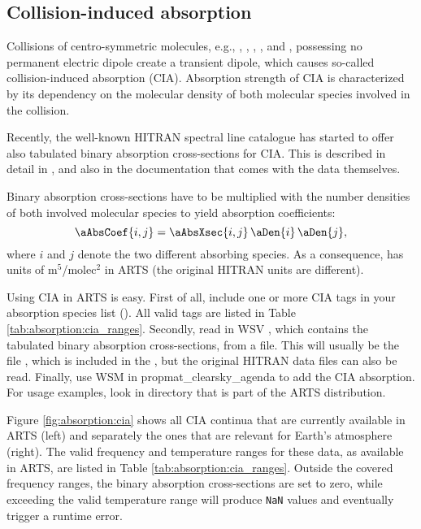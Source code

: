 \subsection{Collision-induced absorption}
\label{sec:absorption:cia}

Collisions of centro-symmetric molecules, e.g., ,
, , , and , possessing no permanent
electric dipole create a transient dipole, which causes so-called collision-induced
absorption (CIA). Absorption strength of CIA is characterized by its dependency
on the molecular density of both molecular species involved in the collision.

Recently, the well-known HITRAN spectral line catalogue has started to
offer also tabulated binary absorption cross-sections for CIA.  This is
described in detail in \citet{richard:12}, and also in the documentation that
comes with the data themselves.

Binary absorption cross-sections
 have to be multiplied with the number densities of both involved
molecular species to yield absorption coefficients:
\begin{equation}
\aAbsCoef{i,j} =  \aAbsXsec{i,j} \, \aDen{i} \, \aDen{j},
\end{equation}
where $i$ and $j$ denote the two different absorbing species. As a
consequence,  has units of m$^5$/molec$^2$ in ARTS (the
original HITRAN units are different).

Using CIA in ARTS is easy. First of all, include one or more CIA tags
in your absorption species list (). All valid
tags are listed in Table \ref{tab:absorption:cia_ranges}. Secondly,
read in WSV , which contains the tabulated
binary absorption cross-sections, from a file. This will usually be the
file , which is included in the
, but the original HITRAN data files can also be
read. Finally, use WSM  in
propmat\_clearsky\_agenda to add the CIA absorption. For usage examples, look
in directory  that is part
of the ARTS distribution.

Figure \ref{fig:absorption:cia} shows all CIA continua that are
currently available in ARTS (left) and separately the ones that are
relevant for Earth's atmosphere (right). The valid frequency and
temperature ranges for these data, as available in ARTS, are listed in
Table \ref{tab:absorption:cia_ranges}. Outside the covered frequency ranges, the
binary absorption cross-sections are set to zero, while exceeding the valid
temperature range will produce \verb|NaN| values and eventually trigger a
runtime error.

